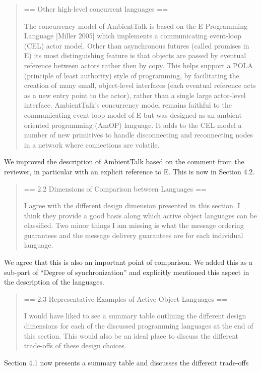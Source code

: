 \documentclass{article}
\begin{document}
\begin{quote}
	== Other high-level concurrent languages ==

The concurrency model of AmbientTalk is based on the E Programming Language [Miller 2005] 
which implements a communicating event-loop (CEL) actor model. Other than asynchronous 
futures (called promises in E) its most distinguishing feature is that objects are passed 
by eventual reference between actors rather then by copy. This helps support a POLA 
(principle of least authority) style of programming, by facilitating the creation of many 
small, object-level interfaces (each eventual reference acts as a new entry point to the 
actor), rather than a single large actor-level interface. AmbientTalk's concurrency model 
remains faithful to the communicating event-loop model of E but was designed as an 
ambient-oriented programming (AmOP) language. It adds to the CEL model a number of new 
primitives to handle disconnecting and reconnecting nodes in a network where connections 
are volatile.
\end{quote}
We improved the description of AmbientTalk based on the comment from the reviewer, in 
particular with an explicit reference to E. This is now in Section 4.2.

\begin{quote}
	== 2.2 Dimensions of Comparison between Languages ==

I agree with the different design dimension presented in this section. I think they 
provide a good basis along which active object languages can be classified. Two minor 
things I am missing is what the message ordering guarantees and the message delivery 
guarantees are for each individual language.
\end{quote}
We agree that this is also an important point of comparison.
We added this as a sub-part of ``Degree of synchronization'' and explicitly mentioned 
this aspect in the description of the languages.

\begin{quote}
	== 2.3 Representative Examples of Active Object Languages ==

I would have liked to see a summary table outlining the different design dimensions for 
each of the discussed programming languages at the end of this section. This would also 
be an ideal place to discuss the different trade-offs of these design choices.
\end{quote}
Section 4.1 now presents a summary table and discusses the different trade-offs
\end{document}
